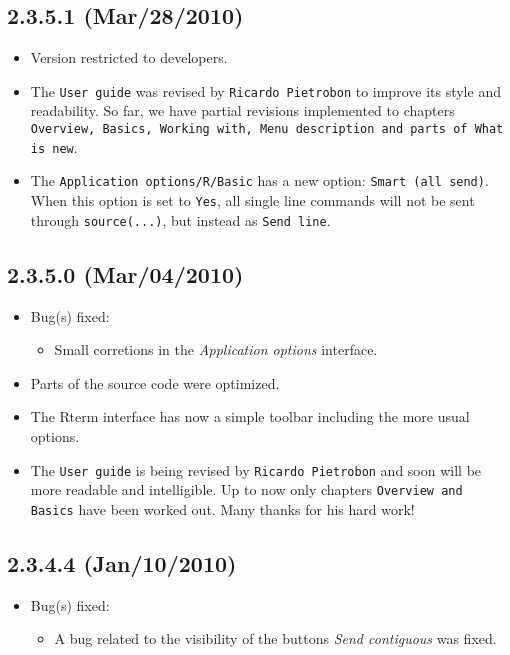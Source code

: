 \subsection*{2.3.5.1 (Mar/28/2010)}
\begin{itemize}
  \item Version restricted to developers.
  \item The \texttt{User guide} was revised by \texttt{Ricardo Pietrobon} to
    improve its style and readability. So far, we have partial revisions
    implemented to chapters \texttt{Overview, Basics, Working with, Menu
      description and parts of What is new}.
  \item The \texttt{Application options/R/Basic} has a new option:
    \texttt{Smart (all send)}. When this option is set to \texttt{Yes}, all
    single line commands will not be sent through \texttt{source(...)}, but
    instead as \texttt{Send line}.
\end{itemize}


\subsection*{2.3.5.0 (Mar/04/2010)}
\begin{itemize}
  \item Bug(s) fixed:
    \begin{itemize}
      \item Small corretions in the \textit{Application options} interface.
    \end{itemize}
  \item Parts of the source code were optimized.
  \item The Rterm interface has now a simple toolbar including the more usual
    options.
  \item The \texttt{User guide} is being revised by \texttt{Ricardo Pietrobon}
    and soon will be more readable and intelligible. Up to now only chapters
    \texttt{Overview and Basics} have been worked out. Many thanks for his
    hard work!
\end{itemize}


\subsection*{2.3.4.4 (Jan/10/2010)}
\begin{itemize}
  \item Bug(s) fixed:
    \begin{itemize}
      \item A bug related to the visibility of the buttons \textit{Send contiguous} was fixed.
    \end{itemize}
\end{itemize}
